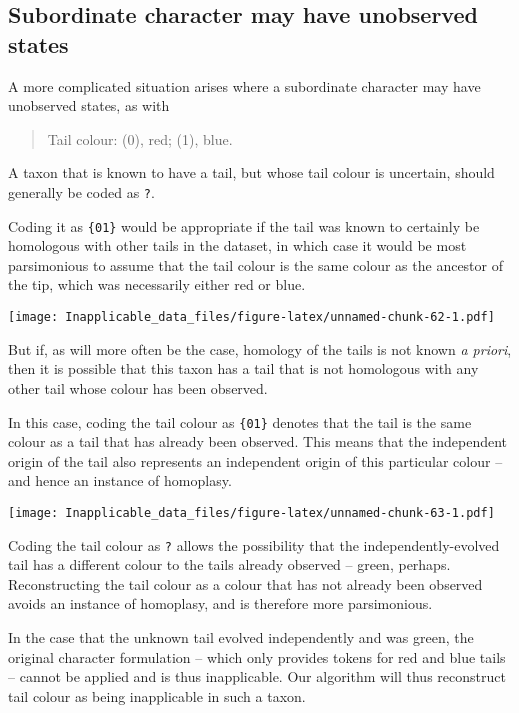 \documentclass[]{book}
\theoremstyle{definition}
\theoremstyle{definition}
\theoremstyle{definition}
\theoremstyle{remark}
\begin{document}
\subsection{Subordinate character may have unobserved
states}\label{subordinate-character-may-have-unobserved-states}

A more complicated situation arises where a subordinate character may
have unobserved states, as with

\begin{quote}
Tail colour: (0), red; (1), blue.
\end{quote}

A taxon that is known to have a tail, but whose tail colour is
uncertain, should generally be coded as \texttt{?}.

Coding it as \texttt{\{01\}} would be appropriate if the tail was known
to certainly be homologous with other tails in the dataset, in which
case it would be most parsimonious to assume that the tail colour is the
same colour as the ancestor of the tip, which was necessarily either red
or blue.

\texttt{[image: Inapplicable\_data\_files/figure-latex/unnamed-chunk-62-1.pdf]}

But if, as will more often be the case, homology of the tails is not
known \emph{a priori}, then it is possible that this taxon has a tail
that is not homologous with any other tail whose colour has been
observed.

In this case, coding the tail colour as \texttt{\{01\}} denotes that the
tail is the same colour as a tail that has already been observed. This
means that the independent origin of the tail also represents an
independent origin of this particular colour -- and hence an instance of
homoplasy.

\texttt{[image: Inapplicable\_data\_files/figure-latex/unnamed-chunk-63-1.pdf]}

Coding the tail colour as \texttt{?} allows the possibility that the
independently-evolved tail has a different colour to the tails already
observed -- green, perhaps. Reconstructing the tail colour as a colour
that has not already been observed avoids an instance of homoplasy, and
is therefore more parsimonious.

In the case that the unknown tail evolved independently and was green,
the original character formulation -- which only provides tokens for red
and blue tails -- cannot be applied and is thus inapplicable. Our
algorithm will thus reconstruct tail colour as being inapplicable in
such a taxon.
\end{document}
